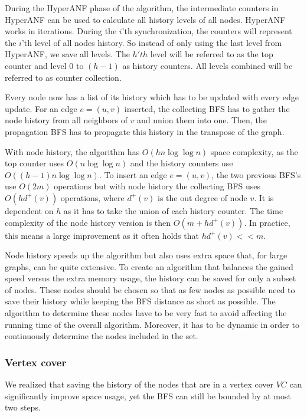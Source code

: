During the HyperANF phase of the algorithm, the intermediate counters in HyperANF can be used to calculate all history levels of all nodes. HyperANF works in iterations. During the $i$'th synchronization, the counters will represent the $i$'th level of all nodes history. So instead of only using the last level from HyperANF, we save all levels. The $h'th$ level will be referred to as the top counter and level $0$ to $(h-1)$ as history counters. All levels combined will be referred to as counter collection.  

Every node now has a list of its history which has to be updated with every edge update. For an edge $e = (u,v)$ inserted, the collecting BFS has to gather the node history from all neighbors of $v$ and union them into one. Then, the propagation BFS has to propagate this history in the transpose of the graph. 

With node history, the algorithm has $O(hn \log \log n)$ space complexity, as the top counter uses $O(n \log \log n)$ and the history counters use $O((h-1)n \log \log n)$. To insert an edge $e = (u,v)$, the two previous BFS's use $O(2m)$ operations but with node history the collecting BFS uses $O(hd^+(v))$ operations, where $d^+(v)$ is the out degree of node $v$. It is dependent on $h$ as it has to take the union of each history counter. The time complexity of the node history version is then $O(m + hd^+(v))$. In practice, this means a large improvement as it often holds that $hd^+(v) << m$.

Node history speeds up the algorithm but also uses extra space that, for large graphs, can be quite extensive. To create an algorithm that balances the gained speed versus the extra memory usage, the history can be saved for only a subset of nodes. These nodes should be chosen so that as few nodes as possible need to save their history while keeping the BFS distance as short as possible. The algorithm to determine these nodes have to be very fast to avoid affecting the running time of the overall algorithm. Moreover, it has to be dynamic in order to continuously determine the nodes included in the set.

\subsubsection{Vertex cover}
\label{sec:vertex_cover}
We realized that saving the history of the nodes that are in a vertex cover $VC$ can significantly improve space usage, yet the BFS can still be bounded by at most two steps.

